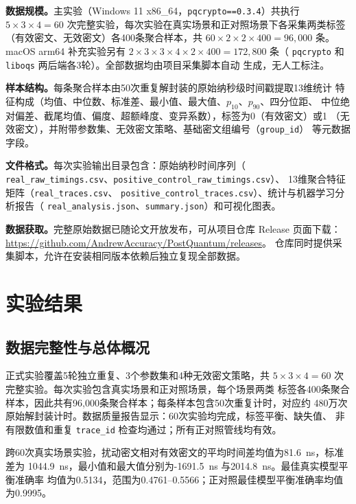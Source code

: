 \documentclass[a4paper,fontset=none]{ctexart}
\begin{document}
\textbf{数据规模。}主实验（Windows 11 x86\_64，\texttt{pqcrypto==0.3.4}）共执行
$5\times3\times4=60$ 次完整实验，每次实验在真实场景和正对照场景下各采集两类标签
（有效密文、无效密文）各400条聚合样本，共 $60\times2\times2\times400=96{,}000$ 条。
macOS arm64 补充实验另有 $2\times3\times3\times4\times2\times400=172{,}800$ 条（
\texttt{pqcrypto} 和 \texttt{liboqs} 两后端各3轮）。全部数据均由项目采集脚本自动
生成，无人工标注。

\textbf{样本结构。}每条聚合样本由50次重复解封装的原始纳秒级时间戳提取13维统计
特征构成（均值、中位数、标准差、最小值、最大值、$p_{10}$、$p_{90}$、四分位距、
中位绝对偏差、截尾均值、偏度、超额峰度、变异系数），标签为0（有效密文）或1
（无效密文），并附带参数集、无效密文策略、基础密文组编号（\texttt{group\_id}）
等元数据字段。

\begin{sloppypar}
\textbf{文件格式。}每次实验输出目录包含：原始纳秒时间序列（
\texttt{real\_raw\_timings.csv}、\texttt{positive\_control\_raw\_timings.csv}）、
13维聚合特征矩阵（\texttt{real\_traces.csv}、
\texttt{positive\_control\_traces.csv}）、统计与机器学习分析报告（
\texttt{real\_analysis.json}、\texttt{summary.json}）和可视化图表。

\textbf{数据获取。}完整原始数据已随论文开放发布，可从项目仓库 Release 页面下载：
\url{https://github.com/AndrewAccuracy/PostQuantum/releases}。
仓库同时提供采集脚本，允许在安装相同版本依赖后独立复现全部数据。
\end{sloppypar}

\section{实验结果}
\label{sec:results}

\subsection{数据完整性与总体概况}

正式实验覆盖5轮独立重复、3个参数集和4种无效密文策略，共
$5\times3\times4=60$ 次完整实验。每次实验包含真实场景和正对照场景，每个场景两类
标签各400条聚合样本，因此共有96,000条聚合样本；每条样本包含50次重复计时，对应约
480万次原始解封装计时。数据质量报告显示：60次实验均完成，标签平衡、缺失值、
非有限数值和重复 \texttt{trace\_id} 检查均通过；所有正对照管线均有效。

跨60次真实场景实验，扰动密文相对有效密文的平均时间差均值为81.6~ns，标准差为
1044.9~ns，最小值和最大值分别为-1691.5~ns 与2014.8~ns。最佳真实模型平衡准确率
均值为0.5134，范围为0.4761--0.5566；正对照最佳模型平衡准确率均值为0.9995。
\end{document}
